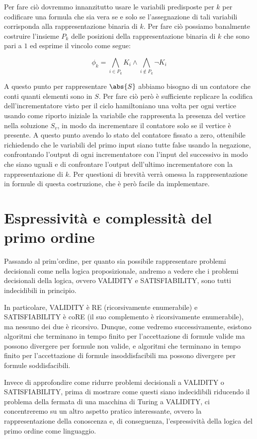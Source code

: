 Per fare ciò dovremmo innanzitutto usare le variabili predisposte per \(k\) per codificare una formula che sia vera se e solo se l'assegnazione di tali variabili corrisponda alla rappresentazione binaria di \(k\). Per fare ciò possiamo banalmente costruire l'insieme \(P_k\) delle posizioni della rappresentazione binaria di \(k\) che sono pari a \(1\) ed esprime il vincolo come segue:

\[\phi_k = \bigwedge_{i \in P_k} K_i \land \bigwedge_{i \notin P_k} \neg K_i\]

A questo punto per rappresentare \(\abs{S}\) abbiamo bisogno di un contatore che conti quanti elementi sono in \(S\). Per fare ciò però è sufficiente replicare la codifica dell'incrementatore visto per il ciclo hamiltoniano una volta per ogni vertice usando come riporto iniziale la variabile che rappresenta la presenza del vertice nella soluzione \(S_v\), in modo da incrementare il contatore solo se il vertice è presente. A questo punto avendo lo stato del contatore fissato a zero, ottenibile richiedendo che le variabili del primo input siano tutte false usando la negazione, confrontando l'output di ogni incrementatore con l'input del successivo in modo che siano uguali e di confrontare l'output dell'ultimo incrementatore con la rappresentazione di \(k\). Per questioni di brevità verrà omessa la rappresentazione in formule di questa costruzione, che è però facile da implementare.

\section{Espressività e complessità del primo ordine}

Passando al prim'ordine, per quanto sia possibile rappresentare problemi decisionali come nella logica proposizionale, andremo a vedere che i problemi decisionali della logica, ovvero VALIDITY e SATISFIABILITY, sono tutti indecidibili in principio.

In particolare, VALIDITY è RE (ricorsivamente enumerabile) e SATISFIABILITY è coRE (il suo complemento è ricorsivamente enumerabile), ma nessuno dei due è ricorsivo. Dunque, come vedremo successivamente, esistono algoritmi che terminano in tempo finito per l'accettazione di formule valide ma possono divergere per formule non valide, e algoritmi che terminano in tempo finito per l'accettazione di formule insoddisfacibili ma possono divergere per formule soddisfacibili.

Invece di approfondire come ridurre problemi decisionali a VALIDITY o SATISFIABILITY, prima di mostrare come questi siano indecidibili riducendo il problema della fermata di una macchina di Turing a VALIDITY, ci concentreremo su un altro aspetto pratico interessante, ovvero la rappresentazione della conoscenza e, di conseguenza, l'espressività della logica del primo ordine come linguaggio.

